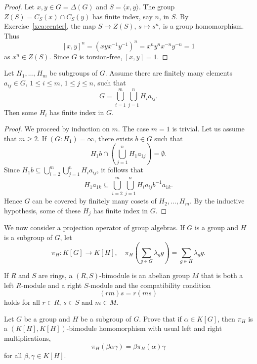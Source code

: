 \begin{proof}
	Let $x,y\in G=\Delta(G)$ and $S=\langle x,y\rangle$. The group $Z(S)=C_S(x)\cap C_S(y)$ has 
	finite index, say $n$, in $S$. By Exercise~\ref{xca:center}, 
	the map $S\to Z(S)$, $s\mapsto s^n$, is a group homomorphism. Thus  
	\[
		[x,y]^n=(xyx^{-1}y^{-1})^n=x^ny^nx^{-n}y^{-n}=1
	\]
	as $x^n\in Z(S)$. Since $G$ is torsion-free, $[x,y]=1$.
\end{proof}

\begin{lemma}[Neumann]
	\label{lem:Neumann}
	Let $H_1,\dots,H_m$ be subgroups of $G$. 
	Assume there are finitely many elements
	$a_{ij}\in G$, $1\leq i\leq m$, $1\leq j\leq n$, such that 
	\[
		G=\bigcup_{i=1}^m\bigcup_{j=1}^n H_ia_{ij}.
	\]
	Then some $H_i$ has finite index in $G$.
\end{lemma}

\begin{proof}
	We proceed by induction on $m$. The case $m=1$ is trivial. 
	Let us assume that $m\geq2$. If $(G:H_1)=\infty$, there exists $b\in G$
	such that 
	\[
		H_1b\cap\left(
	\bigcup_{j=1}^nH_1a_{1j}\right)=\emptyset.
	\]
	Since $H_1b\subseteq\bigcup_{i=2}^m\bigcup_{j=1}^n H_ia_{ij}$, 
	it follows that 
	\[
		H_1a_{1k}\subseteq \bigcup_{i=2}^m\bigcup_{j=1}^n H_ia_{ij}b^{-1}a_{1k}.
	\]
	Hence $G$ can be covered by finitely many cosets of $H_2,\dots,H_m$. By the inductive hypothesis, 
	some of these $H_j$ has finite index in $G$.
\end{proof}

We now consider a projection operator of group algebras. If $G$ 
is a group and $H$ is a subgroup of $G$, let 
\[
	\pi_H\colon K[G]\to K[H],\quad
	\pi_H\left(\sum_{g\in G}\lambda_gg\right)=\sum_{g\in H}\lambda_gg.
\]

If $R$ and $S$ are rings, a $(R,S)$-bimodule is an abelian group
$M$ that is both a left $R$-module and a right $S$-module 
and the compatibility condition 
\[
(rm)s = r(ms)
\]
holds for all $r\in R$, $s\in S$ and $m\in M$.

\begin{exercise}
	Let $G$ be a group and $H$ be a subgroup of $G$. Prove that
	if $\alpha\in
	K[G]$, then $\pi_H$ is a $(K[H],K[H])$-bimodule homomorphism
	with usual left and right multiplications,
	\[
		\pi_H(\beta\alpha\gamma)=\beta\pi_H(\alpha)\gamma
	\]
	for all $\beta,\gamma\in K[H]$.
\end{exercise}


